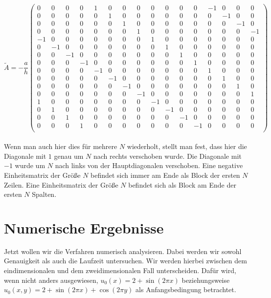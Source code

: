 \documentclass[12pt,a4paper]{scrartcl}
\numberwithin{equation}{section} %
\theoremstyle{definition}
\theoremstyle{plain}
\begin{document}
\begin{equation}
\tilde{A}=-\frac{a}{h}\begin{pmatrix}
0&0&0&0&1&0&0&0&0&0&0&0&-1&0&0&0\\
0&0&0&0&0&1&0&0&0&0&0&0&0&-1&0&0\\
0&0&0&0&0&0&1&0&0&0&0&0&0&0&-1&0\\
0&0&0&0&0&0&0&1&0&0&0&0&0&0&0&-1\\
-1&0&0&0&0&0&0&0&1&0&0&0&0&0&0&0\\
0&-1&0&0&0&0&0&0&0&1&0&0&0&0&0&0\\
0&0&-1&0&0&0&0&0&0&0&1&0&0&0&0&0\\
0&0&0&-1&0&0&0&0&0&0&0&1&0&0&0&0\\
0&0&0&0&-1&0&0&0&0&0&0&0&1&0&0&0\\
0&0&0&0&0&-1&0&0&0&0&0&0&0&1&0&0\\
0&0&0&0&0&0&-1&0&0&0&0&0&0&0&1&0\\
0&0&0&0&0&0&0&-1&0&0&0&0&0&0&0&1\\
1&0&0&0&0&0&0&0&-1&0&0&0&0&0&0&0\\
0&1&0&0&0&0&0&0&0&-1&0&0&0&0&0&0\\
0&0&1&0&0&0&0&0&0&0&-1&0&0&0&0&0\\
0&0&0&1&0&0&0&0&0&0&0&-1&0&0&0&0\\
\end{pmatrix}
\end{equation}
\\[\medskipamount]
Wenn man auch hier dies für mehrere $N$ wiederholt, stellt man fest, dass hier die Diagonale mit $1$ genau um $N$ nach rechts verschoben wurde. Die Diagonale mit $-1$ wurde  um $N$ nach links von der Hauptdiagonalen verschoben.  Eine negative Einheitsmatrix der Größe $N$ befindet sich immer am Ende als Block der ersten $N$ Zeilen. Eine Einheitsmatrix der Größe $N$ befindet sich als Block am Ende der ersten $N$ Spalten.
\section{Numerische Ergebnisse}
Jetzt wollen wir die Verfahren numerisch analysieren. Dabei werden wir sowohl Genauigkeit als auch die Laufzeit untersuchen. Wir werden hierbei zwischen dem eindimensionalen und dem zweidimensionalen Fall unterscheiden. Dafür wird, wenn nicht anders ausgewiesen, $u_0(x)=2+\sin(2\pi x)$ beziehungsweise $u_0(x,y)=2+\sin(2\pi x)+\cos(2\pi y)$ als Anfangsbedingung betrachtet.
\end{document}
